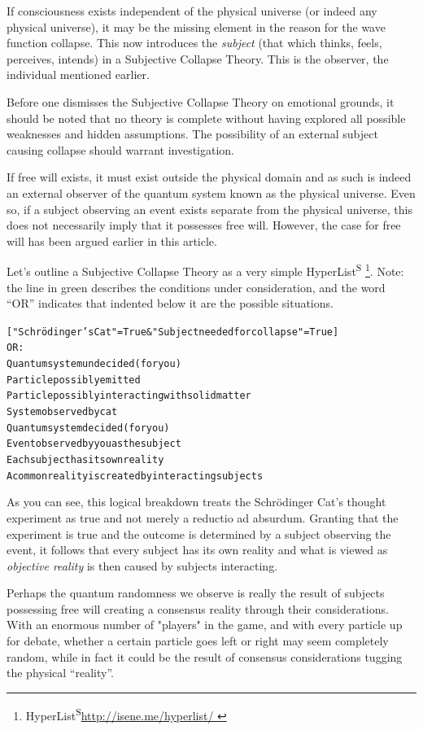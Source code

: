 \documentclass[11pt]{article}
\newcommand{\hyperlist}{H{\sc yper}L{\sc ist}\textsuperscript{\tiny{S}}\hspace*{0.2em}}
\newcommand{\bv}{\vspace{-4mm}\begin{alltt}\begin{textbf}}
\newcommand{\ev}{\end{textbf}\end{alltt}}
\begin{document}
If consciousness exists independent of the physical universe (or indeed any
physical universe), it may be the missing element in the reason for the wave
function collapse. This now introduces the {\em subject} (that which thinks,
feels, perceives, intends) in a Subjective Collapse Theory. This is the
observer, the individual mentioned earlier.

Before one dismisses the Subjective Collapse Theory on emotional grounds, it
should be noted that no theory is complete without having explored all possible
weaknesses and hidden assumptions. The possibility of an external subject
causing collapse should warrant investigation.

If free will exists, it must exist outside the physical domain and as such is
indeed an external observer of the quantum system known as the physical
universe. Even so, if a subject observing an event exists separate from the
physical universe, this does not necessarily imply that it possesses free will.
However, the case for free will has been argued earlier in this article.

Let's outline a Subjective Collapse Theory as a very simple \hyperlist
\footnote{ \hyperlist \url{http://isene.me/hyperlist/ }}. Note: the line in
green describes the conditions under consideration, and the word ``OR'' indicates
that indented below it are the possible situations.

\bv
   \textcolor{g}{["Schr\"{o}dinger's Cat" = True & "Subject needed for collapse" = True]}
      \textcolor{b}{OR:} 
         Quantum system undecided \textcolor{t}{(for you)}
            Particle possibly emitted 
            Particle possibly interacting with solid matter 
            System observed by cat 
         Quantum system decided \textcolor{t}{(for you)}
            Event observed by you as the subject 
      Each subject has its own reality 
      A common reality is created by interacting subjects
\ev

As you can see, this logical breakdown treats the Schr\"{o}dinger Cat's thought
experiment as true and not merely a reductio ad absurdum. Granting that the
experiment is true and the outcome is determined by a subject observing the
event, it follows that every subject has its own reality and what is
viewed as {\em objective reality} is then caused by subjects interacting.

Perhaps the quantum randomness we observe is really the result of subjects
possessing free will creating a consensus reality through their considerations.
With an enormous number of "players" in the game, and with every particle up for
debate, whether a certain particle goes left or right may seem completely
random, while in fact it could be the result of consensus considerations
tugging the physical ``reality''.
\end{document}
